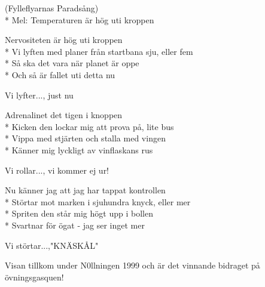 \begin{SongText}
    \begin{SongInfo}
        (Fylleflyarnas Paradsång)\\*%
        Mel: Temperaturen är hög uti kroppen
    \end{SongInfo}
    \begin{SongVerse}
        Nervositeten är hög uti kroppen\\*%
        Vi lyften med planer från startbana sju, eller fem\\*%
        Så ska det vara när planet är oppe\\*%
        Och så är fallet uti detta nu
    \end{SongVerse}
    \begin{SongVerse}
        Vi lyfter..., just nu
    \end{SongVerse}
    \begin{SongVerse}
        Adrenalinet det tigen i knoppen\\*%
        Kicken den lockar mig att prova på, lite bus\\*%
        Vippa med stjärten och stalla med vingen\\*%
        Känner mig lyckligt av vinflaskans rus
    \end{SongVerse}
    \begin{SongVerse}
        Vi rollar..., vi kommer ej ur!
    \end{SongVerse}
    \begin{SongVerse}
        Nu känner jag att jag har tappat kontrollen\\*%
        Störtar mot marken i sjuhundra knyck, eller mer\\*%
        Spriten den står mig högt upp i bollen\\*%
        Svartnar för ögat - jag ser inget mer
    \end{SongVerse}
    \begin{SongVerse}
        Vi störtar...,"KNÄSKÅL"
    \end{SongVerse}
    \begin{SongInfo}
        Visan tillkom under N0llningen 1999 och är det vinnande bidraget på övningsgasquen!
    \end{SongInfo}
\end{SongText}
